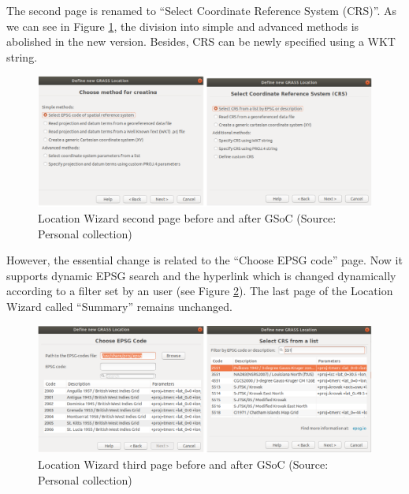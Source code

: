 \documentclass[a4paper,10pt,twoside]{article}
\begin{document}
\noindent The second page is renamed to ``Select Coordinate Reference
System (CRS)''. As we can see in Figure \ref{fig:loc_wiz_2}, the
division into simple and advanced methods is abolished in the new
version. Besides, CRS can be newly specified using a WKT string.

\vspace{0.3cm}
\begin{figure}[hbt!] 
\begin{center}
\includegraphics[width=17cm]{../pictures/loc_wiz_2.png} 
\caption[Location Wizard second page before and after GSoC]{Location Wizard second page before and after GSoC (Source: Personal collection)}
\label{fig:loc_wiz_2}
\end{center}
\end{figure}

\noindent However, the essential change is related to the ``Choose
EPSG code'' page. Now it supports dynamic EPSG search and the
hyperlink which is changed dynamically according to a filter set by an
user (see Figure \ref{fig:loc_wiz_3}). The last page of the Location
Wizard called ``Summary'' remains unchanged.

\vspace{0.3cm}
\begin{figure}[hbt!] 
\begin{center}
\includegraphics[width=17cm]{../pictures/loc_wiz_3.png} 
\caption[Location Wizard third page before and after GSoC)]{Location Wizard third page before and after GSoC (Source: Personal collection)}
\label{fig:loc_wiz_3}
\end{center}
\end{figure}
\end{document}
